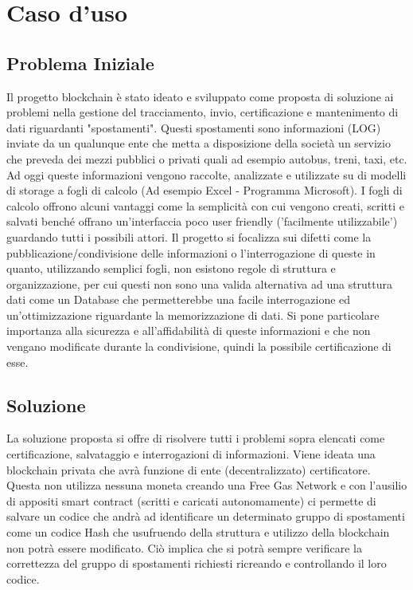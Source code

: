 \documentclass[11pt,a4paper,titlepage, twoside, openright]{report}
\begin{document}
\chapter{Caso d'uso}

\section{Problema Iniziale}
Il progetto blockchain è stato ideato e sviluppato come proposta di soluzione ai problemi nella gestione del tracciamento, invio, certificazione e mantenimento di dati riguardanti "spostamenti". Questi spostamenti sono informazioni (LOG) inviate da un qualunque ente che metta a disposizione della società un servizio che preveda dei mezzi pubblici o privati quali ad esempio autobus, treni, taxi, etc. Ad oggi queste informazioni vengono raccolte, analizzate e utilizzate su di modelli di storage a fogli di calcolo (Ad esempio Excel - Programma Microsoft). I fogli di calcolo offrono alcuni vantaggi come la semplicità con cui vengono creati, scritti e salvati benché offrano un'interfaccia poco user friendly ('facilmente utilizzabile') guardando tutti i possibili attori. Il progetto si focalizza sui difetti come la pubblicazione/condivisione delle informazioni o l'interrogazione di queste in quanto, utilizzando semplici fogli, non esistono regole di struttura e organizzazione, per cui questi non sono una valida alternativa ad una struttura dati come un Database che permetterebbe una facile interrogazione ed un'ottimizzazione riguardante la memorizzazione di dati. Si pone particolare importanza alla sicurezza e all'affidabilità di queste informazioni e che non vengano modificate durante la condivisione, quindi la possibile certificazione di esse.

\section{Soluzione}
La soluzione proposta si offre di risolvere tutti i problemi sopra elencati come certificazione, salvataggio e interrogazioni di informazioni. Viene ideata una blockchain privata che avrà funzione di ente (decentralizzato) certificatore. Questa non utilizza nessuna moneta creando una Free Gas Network e con l'ausilio di appositi smart contract (scritti e caricati autonomamente) ci permette di salvare un codice che andrà ad identificare un determinato gruppo di spostamenti come un codice Hash che usufruendo della struttura e utilizzo della blockchain non potrà essere modificato. Ciò implica che si potrà sempre verificare la correttezza del gruppo di spostamenti richiesti ricreando e controllando il loro codice.
\end{document}
